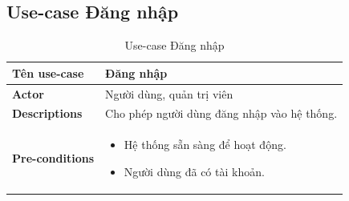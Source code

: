 \subsection{Use-case Đăng nhập}
    \begin{longtable}[H]{|l|p{}|}
        \caption{Use-case Đăng nhập} \\
        \hline
        \textbf{Tên use-case} & Đăng nhập \\
    \hline
        \textbf{Actor} & Người dùng, quản trị viên \\
    \hline
        \textbf{Descriptions} & Cho phép người dùng đăng nhập vào hệ thống. \\
    \hline
        \textbf{Pre-conditions} & \vspace{-0.75cm} \begin{itemize}[leftmargin=4mm]
            \setlength\itemsep{0em}
            \item Hệ thống sẵn sàng để hoạt động.
            \item Người dùng đã có tài khoản.
        \end{itemize} \\
            

\end{longtable}
